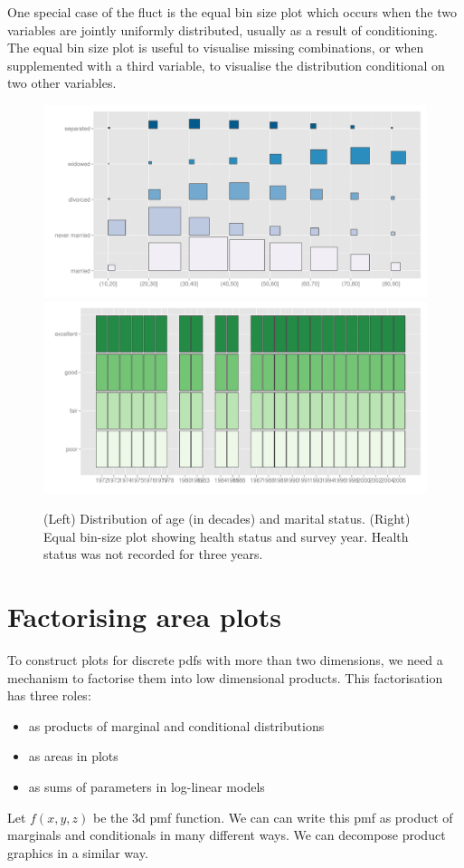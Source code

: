\documentclass[letterpaper,oneside]{scrartcl}
\begin{document}
One special case of the fluct is the equal bin size plot which occurs when the two variables are jointly uniformly distributed, usually as a result of conditioning. The equal bin size plot is useful to visualise missing combinations, or when supplemented with a third variable, to visualise the distribution conditional on two other variables.

\begin{figure}[htbp]
  \centering
    \includegraphics[width=0.5\linewidth]{part-fluct}%
    \includegraphics[width=0.5\linewidth]{part-fluct-cond}
  \caption{(Left) Distribution of age (in decades) and marital status. (Right) Equal bin-size plot showing health status and survey year. Health status was not recorded for three years.}
  \label{fig:fluct}
\end{figure}

\section{Factorising area plots}
\label{sec:combination}

To construct plots for discrete pdfs with more than two dimensions, we need a mechanism to factorise them into low dimensional products. This factorisation has three roles:

\begin{itemize}
  \item as products of marginal and conditional distributions
  \item as areas in plots
  \item as sums of parameters in log-linear models
\end{itemize}

Let $f(x, y, z)$ be the 3d pmf function. We can can write this pmf as product of marginals and conditionals in many different ways.  We can decompose product graphics in a similar way.
\end{document}
